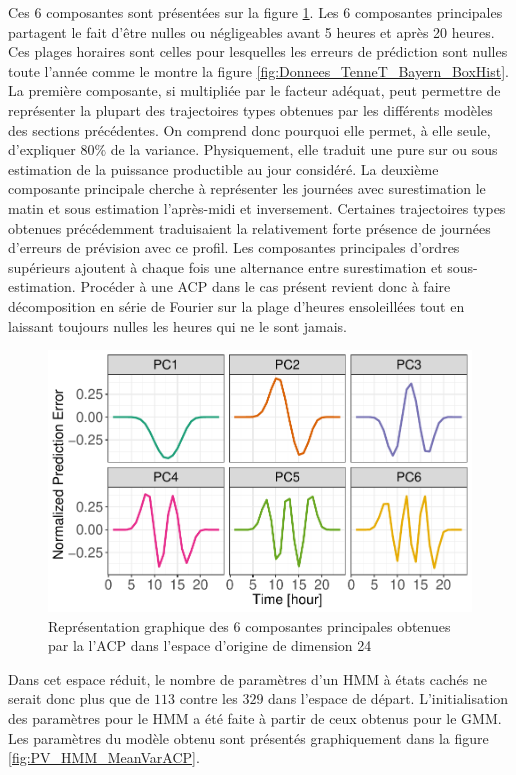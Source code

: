 \documentclass[12pt, french]{report}
\begin{document}
Ces 6 composantes sont présentées sur la figure \ref{fig:PV_HMM_ACP_PC}. Les 6 composantes principales partagent le fait d'être nulles ou négligeables avant 5 heures et après 20 heures. Ces plages horaires sont celles pour lesquelles les erreurs de prédiction sont nulles toute l'année comme le montre la figure \ref{fig:Donnees_TenneT_Bayern_BoxHist}. La première composante, si multipliée par le facteur adéquat, peut permettre de représenter la plupart des trajectoires types obtenues par les différents modèles des sections précédentes. On comprend donc pourquoi elle permet, à elle seule, d'expliquer $80\%$ de la variance. Physiquement, elle traduit une pure sur ou sous estimation de la puissance productible au jour considéré. La deuxième composante principale cherche à représenter les journées avec surestimation le matin et sous estimation l'après-midi et inversement. Certaines trajectoires types obtenues précédemment traduisaient la relativement forte présence de journées d'erreurs de prévision avec ce profil. Les composantes principales d'ordres supérieurs ajoutent à chaque fois une alternance entre surestimation et sous-estimation. Procéder à une ACP dans le cas présent revient donc à faire décomposition en série de Fourier sur la plage d'heures ensoleillées tout en laissant toujours nulles les heures qui ne le sont jamais.

\begin{figure}[htbp]
	\centering
	\includegraphics[width = 0.8 \linewidth]{Images/PV/ACP/ACP_PrincipalComp_6.pdf}
	\caption{Représentation graphique des 6 composantes principales obtenues par la l'ACP dans l'espace d'origine de dimension 24}
	\label{fig:PV_HMM_ACP_PC}
\end{figure}

Dans cet espace réduit, le nombre de paramètres d'un HMM à états cachés ne serait donc plus que de $113$ contre les $329$ dans l'espace de départ. L'initialisation des paramètres pour le HMM a été faite à partir de ceux obtenus pour le GMM. Les paramètres du modèle obtenu sont présentés graphiquement dans la figure \ref{fig:PV_HMM_MeanVarACP}.
\end{document}
